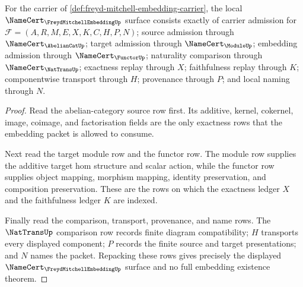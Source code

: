 \begin{theorem}
\label{thm:freyd-mitchell-embedding-namecert-obligations}
For the carrier of \autoref{def:freyd-mitchell-embedding-carrier}, the local $\NameCert_{\FreydMitchellEmbeddingUp}$ surface consists exactly of carrier admission for $\mathcal F=(A,R,M,E,X,K,C,H,P,N)$; source admission through $\NameCert_{\AbelianCatUp}$; target admission through $\NameCert_{\ModuleUp}$; embedding admission through $\NameCert_{\FunctorUp}$; naturality comparison through $\NameCert_{\NatTransUp}$; exactness replay through $X$; faithfulness replay through $K$; componentwise transport through $H$; provenance through $P$; and local naming through $N$.
\end{theorem}
\begin{proof}
Read the abelian-category source row first. Its additive, kernel, cokernel, image, coimage, and factorisation fields are the only exactness rows that the embedding packet is allowed to consume.

Next read the target module row and the functor row. The module row supplies the additive target hom structure and scalar action, while the functor row supplies object mapping, morphism mapping, identity preservation, and composition preservation. These are the rows on which the exactness ledger $X$ and the faithfulness ledger $K$ are indexed.

Finally read the comparison, transport, provenance, and name rows. The $\NatTransUp$ comparison row records finite diagram compatibility; $H$ transports every displayed component; $P$ records the finite source and target presentations; and $N$ names the packet. Repacking these rows gives precisely the displayed $\NameCert_{\FreydMitchellEmbeddingUp}$ surface and no full embedding existence theorem.
\end{proof}


\begin{closurestatus}{\FreydMitchellEmbeddingUp}
  \theoryclosure{\seedClosure}
  \formalstatus{\unformalizedV}
\end{closurestatus}
